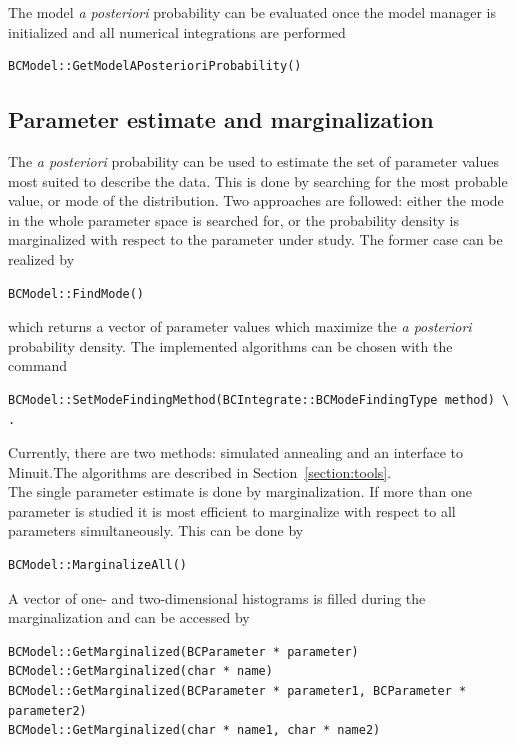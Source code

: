 \documentclass[11pt, a4paper]{article}
\begin{document}
\noindent 
The model {\it a posteriori} probability can be evaluated once the
model manager is initialized and all numerical integrations are
performed
%
\begin{verbatim}
BCModel::GetModelAPosterioriProbability()
\end{verbatim}


\subsection{Parameter estimate and marginalization} 

The {\it a posteriori} probability can be used to estimate the set of
parameter values most suited to describe the data. This is done by
searching for the most probable value, or mode of the
distribution. Two approaches are followed: either the mode in the
whole parameter space is searched for, or the probability density is
marginalized with respect to the parameter under study. The former
case can be realized by 
%
\begin{verbatim} 
BCModel::FindMode()
\end{verbatim} 

\noindent 
which returns a vector of parameter values which maximize the {\it a
posteriori} probability density. The implemented algorithms can be chosen
with the command
%
\begin{verbatim}
BCModel::SetModeFindingMethod(BCIntegrate::BCModeFindingType method) \ .
\end{verbatim}
%
Currently, there are two methods: simulated annealing and an interface
to Minuit.The algorithms are described in
Section~\ref{section:tools}. \\

\noindent 
The single parameter estimate is done by marginalization. If more than
one parameter is studied it is most efficient to marginalize with
respect to all parameters simultaneously. This can be done by
%
\begin{verbatim}
BCModel::MarginalizeAll() 
\end{verbatim} 

\noindent 
A vector of one- and two-dimensional histograms is filled during the
marginalization and can be accessed by
%
\begin{verbatim}
BCModel::GetMarginalized(BCParameter * parameter) 
BCModel::GetMarginalized(char * name) 
BCModel::GetMarginalized(BCParameter * parameter1, BCParameter * parameter2) 
BCModel::GetMarginalized(char * name1, char * name2) 
\end{verbatim}
\end{document}
